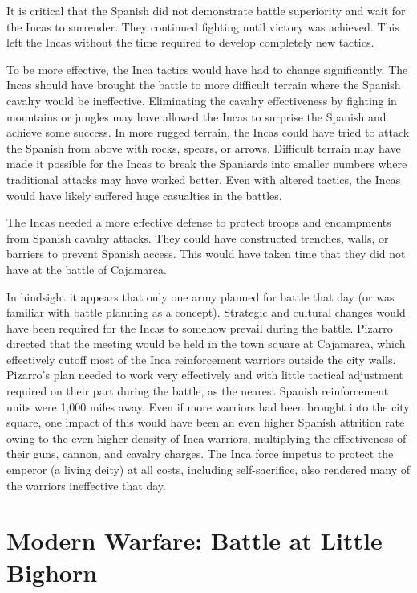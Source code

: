 \documentclass[letterpaper,10pt]{article}
\begin{document}
It is critical that the Spanish did not demonstrate battle superiority and wait for the Incas to surrender.  They continued fighting until victory was achieved.  This left the Incas without the time required to develop completely new tactics.

To be more effective, the Inca tactics would have had to change significantly. The Incas should have brought the battle to more difficult terrain where the Spanish cavalry would be ineffective.  Eliminating the cavalry effectiveness by fighting in mountains or jungles may have allowed the Incas to surprise the Spanish and achieve some success.  In more rugged terrain, the Incas could have tried to attack the Spanish from above with rocks, spears, or arrows.  Difficult terrain may have made it possible for the Incas to break the Spaniards into smaller numbers where traditional attacks may have worked better.  Even with altered tactics, the Incas would have likely suffered huge casualties in the battles.

The Incas needed a more effective defense to protect troops and encampments from Spanish cavalry attacks.  They could have constructed trenches, walls, or barriers to prevent Spanish access.  This would have taken time that they did not have at the battle of Cajamarca.

In hindsight it appears that only one army planned for battle that day (or was familiar with battle planning as a concept).  Strategic and cultural changes would have been required for the Incas to somehow prevail during the battle.  Pizarro directed that the meeting would be held in the town square at Cajamarca, which effectively cutoff most of the Inca reinforcement warriors outside the city walls.  Pizarro's plan needed to work very effectively and with little tactical adjustment required on their part during the battle, as the nearest Spanish reinforcement units were 1,000 miles away.  Even if more warriors had been brought into the city square, one impact of this would have been an even higher Spanish attrition rate owing to the even higher density of Inca warriors, multiplying the effectiveness of their guns, cannon, and cavalry charges.  The Inca force impetus to protect the emperor (a living deity) at all costs, including self-sacrifice, also rendered many of the warriors ineffective that day.

\section{Modern Warfare: Battle at Little Bighorn}
\end{document}
